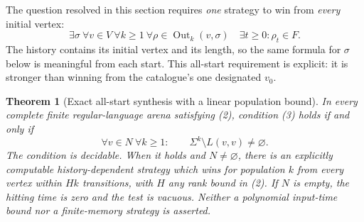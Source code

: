 \documentclass[11pt]{article}
\newtheorem{theorem}{Theorem}
\theoremstyle{definition}
\theoremstyle{remark}
\begin{document}
The question resolved in this section requires \emph{one} strategy to win
from \emph{every} initial vertex:
\[
 \exists\sigma\ \forall v\in V\ \forall k\geq1\
 \forall\rho\in\operatorname{Out}_k(v,\sigma)
       \quad\exists t\geq0:\rho_t\in F.              \tag{3}
\]
The history contains its initial vertex and its length, so the same formula
for $\sigma$ below is meaningful from each start. This all-start
requirement is explicit: it is stronger than winning from the catalogue's
one designated $v_0$.

\begin{theorem}[Exact all-start synthesis with a linear population bound]
\label{thm:ordered}
In every complete finite regular-language arena satisfying (2), condition
(3) holds if and only if
\[
 \forall v\in N\ \forall k\geq1:\qquad
                    \Sigma^k\setminus L(v,v)\ne\varnothing.    \tag{4}
\]
The condition is decidable. When it holds and $N\ne\varnothing$, there is
an explicitly computable history-dependent strategy which wins for
population $k$ from every vertex within $Hk$ transitions, with $H$ any
rank bound in (2). If $N$ is empty, the hitting time is zero and the test
is vacuous. Neither a polynomial input-time bound nor a finite-memory
strategy is asserted.
\end{theorem}
\end{document}
